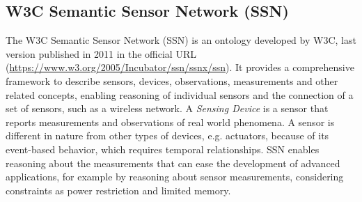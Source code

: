 \documentclass{sig-alternate-05-2015}
\begin{document}
\subsection{W3C Semantic Sensor Network (SSN)}
The W3C Semantic Sensor Network (SSN) \cite{Compton2012} is an ontology developed by W3C, last version published in 2011 in the official URL (\url{https://www.w3.org/2005/Incubator/ssn/ssnx/ssn}). It provides a comprehensive framework to describe sensors, devices, observations, measurements and other related concepts, enabling reasoning of individual sensors and the connection of a set of sensors, such as a wireless network. A \textit{Sensing Device} is a sensor that reports measurements and observations of real world phenomena. A sensor is different in nature from other types of devices, e.g. actuators, because of its event-based behavior, which requires temporal relationships. SSN enables reasoning about the measurements that can ease the development of advanced applications, for example by reasoning about sensor measurements, considering constraints as power restriction and limited memory. 
\end{document}
